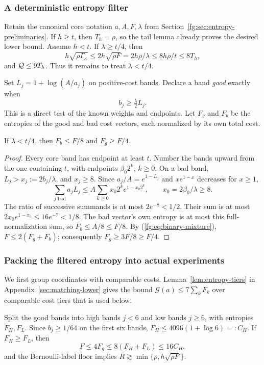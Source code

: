 \subsubsection{A deterministic entropy filter}
Retain the canonical core notation $a,A,F,\lambda$ from
Section~\ref{fg:sec:entropy-preliminaries}.
If $h\ge t$, then $T_h=\rho$, so the tail lemma already proves the
desired lower bound. Assume $h<t$. If $\lambda\ge t/4$, then
\[
 h\sqrt{\rho\Gamma_\kappa}\le2h\sqrt{\rho F}
 =2h\rho/\lambda\le8h\rho/t\le8T_h,
\]
and $\mathcal Q\le9T_h$. Thus it remains to treat $\lambda<t/4$.

Set $L_j=1+\log(A/a_j)$ on positive-cost bands. Declare a band
\emph{good} exactly when
\begin{equation}\label{fg:eq:good-band}
                       b_j\ge\tfrac\lambda2 L_j.
\end{equation}
This is a direct test of the known weights and endpoints.
Let $F_g$ and $F_b$ be the entropies of the good and bad cost vectors,
each normalized by its own total cost.

\begin{lemma}\label{fg:lem:filter}
If $\lambda<t/4$, then $F_b\le F/8$ and $F_g\ge F/4$.
\end{lemma}
\begin{proof}
Every core band has endpoint at least $t$. Number the bands upward
from the one containing $t$, with endpoints $\beta_0 2^k$, $k\ge0$.
On a bad band, $L_j>x_j:=2b_j/\lambda$, and $x_j\ge8$.
Since $a_j/A=e^{1-L_j}$ and $xe^{1-x}$ decreases for $x\ge1$,
\[
 \sum_{j\text{ bad}}a_jL_j
 \le A\sum_{k\ge0}x_0 2^k e^{1-x_0 2^k},\qquad x_0=2\beta_0/\lambda\ge8.
\]
The ratio of successive summands is at most $2e^{-8}<1/2$.
Their sum is at most $2x_0e^{1-x_0}\le16e^{-7}<1/8$.
The bad vector's own entropy is at most this full-normalization sum,
so $F_b\le A/8\le F/8$. By (\ref{fg:eq:binary-mixture}),
$F\le2(F_g+F_b)$; consequently $F_g\ge3F/8\ge F/4$.
\end{proof}

\subsubsection{Packing the filtered entropy into actual experiments}
We first group coordinates with comparable costs.
Lemma~\ref{lem:entropy-tiers} in Appendix~\ref{sec:matching-lower}
gives the bound $\mathcal G(a)\le7\sum_kF_k$ over comparable-cost
tiers that is used below.

Split the good bands into high bands $j<6$ and low bands $j\ge6$,
with entropies $F_H,F_L$. Since $b_j\ge1/64$ on the first six bands,
$F_H\le4096(1+\log6)=:C_H$.
If $F_H\ge F_L$, then
\[
 F\le4F_g\le8(F_H+F_L)\le16C_H,
\]
and the Bernoulli-label floor implies
$R\gtrsim\min\{\rho,h\sqrt{\rho F}\}$.

